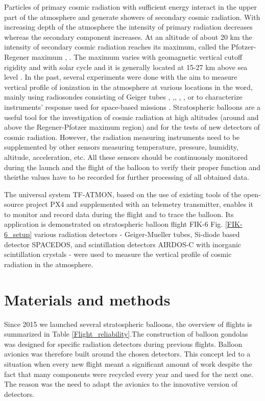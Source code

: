 \documentclass{Rpd}
\begin{document}
Particles of primary cosmic radiation with sufficient energy interact in the upper part of the atmosphere and generate showers of secondary cosmic radiation. With increasing depth of the atmosphere the intensity of primary radiation decreases whereas the secondary component increases. At an altitude of about 20 km the intensity of secondary cosmic radiation reaches its maximum, called the Pfotzer-Regener maximum \cite{Regener}, \cite{Pfotzer}. The maximum varies with geomagnetic vertical cutoff rigidity and with solar cycle and it is generally located at 15-27 km above sea level \cite{Bazilevskaya}.
In the past, several experiments were done with the aim to measure vertical profile of ionization in the atmosphere at various locations in the word, mainly using radiosondes consisting of Geiger tubes \cite{Bazilevskaya}, \cite{ionization_profile},\cite{Vertical_profile_measurements}, \cite{cosmic_ray_intensity}, \cite{Radioactivity_atmosphere}, or to characterize instruments’ response used for space-based missions \cite{Lawrence} \cite{Mukherjee} \cite{Timepix}.
Stratospheric balloons are a useful tool for the investigation of cosmic radiation at high altitudes (around and above the Regener-Pfotzer maximum region) and for the tests of new detectors of cosmic radiation.
However, the radiation measuring instruments need to be supplemented by other sensors measuring temperature, pressure, humidity, altitude, acceleration, etc.  All these sensors should be continuously monitored during the launch and the flight of the balloon to verify their proper function and theirthe values have to be recorded for further processing of all obtained data.

The universal system TF-ATMON, based on the use of existing tools of the open-source project PX4 and supplemented with an telemetry transmitter, enables it to monitor and record data during the flight and to trace the balloon. Its application is demonstrated on stratospheric balloon flight FIK-6 Fig. \ref{FIK-6_setup} various radiation detectors - Geiger-Mueller tubes, Si-diode based detector SPACEDOS, and scintillation detectors AIRDOS-C with inorganic scintillation crystals - were used to measure the vertical profile of cosmic radiation in the atmosphere.

\section{Materials and methods}

Since 2015 we launched several stratospheric balloons, the overview of flights is summarized in Table \ref{Flight_reliability}.The construction of balloon gondolas was designed for specific radiation detectors during previous flights. Balloon avionics was therefore built around the chosen detectors.
This concept led to a situation when every new flight meant a significant amount of work despite the fact that many components were recycled every year and used for the next one. The reason was the need to adapt the avionics to the innovative version of detectors.
\end{document}
